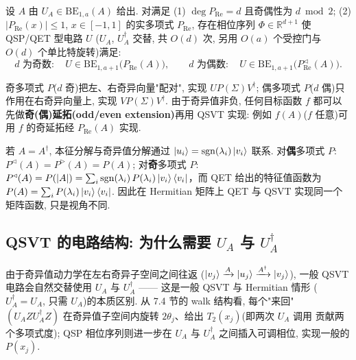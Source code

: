 \documentclass[utf8]{article} %
\numberwithin{equation}{section}   %
\newtheorem{Thm}{\hskip 2em {\color{blue} 定理}}[subsection]
\newtheorem{Note}{\hskip 2em {\color{red} 注}}[subsection]
\newtheorem{Eg}{\hskip 2em {\color{black} 例}}[subsection]
\begin{document}
\begin{Thm}
    设 $A$ 由 $U_A \in \mathrm{BE}_{1,a}(A)$ 给出. 对满足
    (1) $\deg P_{\mathrm{Re}} = d$ 且奇偶性为 $d \bmod 2$;
    (2) $|P_{\mathrm{Re}}(x)| \le 1$, $x \in [-1,1]$ 的实多项式 $P_{\mathrm{Re}}$,
    存在相位序列 $\Phi \in \mathbb{R}^{d+1}$ 使 QSP/QET 型电路 $U$
    ($U_A$, $U_A^\dagger$ 交替, 共 $O(d)$ 次, 另用 $O(a)$ 个受控门与 $O(d)$ 个单比特旋转)满足:
    \begin{equation}
        d \text{ 为奇数}: \quad U \in \mathrm{BE}_{1,a+1}\big(P_{\mathrm{Re}}(A)\big),
        \qquad
        d \text{ 为偶数}: \quad U \in \mathrm{BE}_{1,a+1}\big(P_{\mathrm{Re}}^\triangleleft(A)\big).
    \end{equation}
\end{Thm}

\begin{Note}[奇偶性的意义]
    奇多项式 $P$($d$ 奇)把左、右奇异向量"配对", 实现 $U P(\Sigma) V^\dagger$;
    偶多项式 $P$($d$ 偶)只作用在右奇异向量上, 实现 $V P(\Sigma) V^\dagger$.
    由于奇异值非负, 任何目标函数 $f$ 都可以先做\textbf{奇(偶)延拓(odd/even extension)}再用 QSVT 实现:
    例如 $f(A)$($f$ 任意)可用 $f$ 的奇延拓经 $P_{\mathrm{Re}}(A)$ 实现.
\end{Note}

\begin{Eg}[Hermitian 情形]
    若 $A = A^\dagger$, 本征分解与奇异值分解通过 $\ket{u_i} = \mathrm{sgn}(\lambda_i)\ket{v_i}$
    联系. 对\textbf{偶}多项式 $P$: $P^\triangleleft(A) = P^\triangleright(A) = P(A)$; 对\textbf{奇}多项式 $P$:
    $P^\triangleleft(A) = P(|A|) = \sum_i \mathrm{sgn}(\lambda_i)\,P(\lambda_i)\ket{v_i}\bra{v_i}$，而 QET 给出的特征值函数为 $P(A) = \sum_i P(\lambda_i)\ket{v_i}\bra{v_i}$.
    因此在 Hermitian 矩阵上 QET 与 QSVT 实现同一个矩阵函数, 只是视角不同.
\end{Eg}

\subsection{QSVT 的电路结构: 为什么需要 $U_A$ 与 $U_A^\dagger$}

由于奇异值动力学在左右奇异子空间之间往返
($\ket{v_j} \xrightarrow{A} \ket{u_j} \xrightarrow{A^\dagger} \ket{v_j}$),
一般 QSVT 电路会自然交替使用 $U_A$ 与 $U_A^\dagger$ —— 这是一般 QSVT 与 Hermitian 情形
($U_A^\dagger = U_A$, 只需 $U_A$)的本质区别. 从 7.4 节的 walk 结构看, 每个"来回"
$(U_A Z U_A^\dagger Z)$ 在奇异值子空间内旋转 $2\theta_j$、给出 $T_2(x_j)$(即两次 $U_A$ 调用
贡献两个多项式度); QSP 相位序列则进一步在 $U_A$ 与 $U_A^\dagger$ 之间插入可调相位,
实现一般的 $P(x_j)$.
\end{document}

